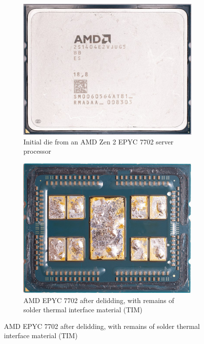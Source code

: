 \begin{figure}[ht]
    \centering
    \begin{subfigure}[b]{0.3\textwidth}
        \includegraphics[width=\textwidth]{c2_soa/img/epyc_7702_initial.jpg}
        \caption{Initial die from an AMD Zen 2 EPYC 7702 server processor}
        \label{fig:initial_die}
    \end{subfigure}
    \hfill
    \begin{subfigure}[b]{0.3\textwidth}
        \includegraphics[width=\textwidth]{c2_soa/img/epyc_7702_delidding.jpg}
        \caption{AMD EPYC 7702 after delidding, with remains of solder thermal interface material (TIM)}
        \label{fig:delidding_die}

\end{subfigure}
\end{figure}
